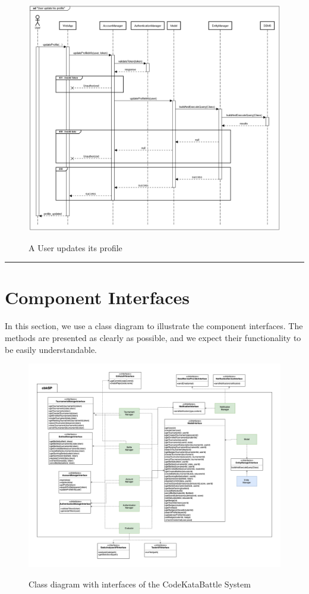 \documentclass{Configuration_Files/Template}
\begin{document}
\begin{figure}[H]
\centering
\includegraphics[scale = 0.33]{Images/diagrams/sequences/updateProfile.png}\\
\caption{A User updates its profile}
\end{figure}

{\color{bluepoli}\rule{\linewidth}{0.1pt}}

\section{Component Interfaces}
In this section, we use a class diagram to illustrate the component interfaces. The methods are presented as clearly as possible, and we expect their functionality to be easily understandable.


\begin{figure}[H]
\centering
\includegraphics[angle=90, scale = 0.33]{Images/diagrams/ComponentSystem.png}\\
\caption{Class diagram with interfaces of the CodeKataBattle System}
\end{figure}
\end{document}
